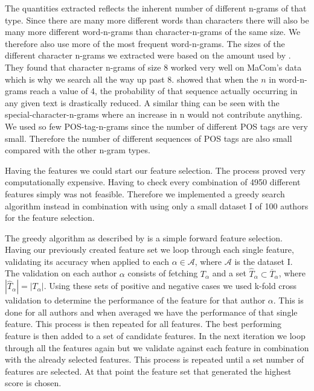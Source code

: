 The quantities extracted reflects the inherent number of different n-grams of
that type. Since there are many more different words than characters there will
also be many more different word-n-grams than character-n-grams of the same
size. We therefore also use more of the most frequent word-n-grams. The sizes
of the different character n-grams we extracted were based on the amount used by
\citet{aalykke2016}. They found that character n-grams of size 8 worked very
well on MaCom's data which is why we search all the way up past 8. \citet{US}
showed that when the $n$ in word-n-grams reach a value of 4, the probability of
that sequence actually occurring in any given text is drastically reduced. A
similar thing can be seen with the special-character-n-grams where an increase
in n would not contribute anything. We used so few \gls{POS}-tag-n-grams since
the number of different \gls{POS} tags are very small. Therefore the number of
different sequences of \gls{POS} tags are also small compared with the other
n-gram types.

Having the features we could start our feature selection. The process proved
very computationally expensive. Having to check every combination of 4950
different features simply was not feasible. Therefore we implemented a greedy
search algorithm instead in combination with using only a small dataset \gls{I}
of 100 authors for the feature selection.

The greedy algorithm as described by \citet{kanDeng} is a simple forward feature
selection. Having our previously created feature set we loop through each single
feature, validating its accuracy when applied to each $\alpha \in \mathcal{A}$,
where $\mathcal{A}$ is the dataset \gls{I}. The validation on each author
$\alpha$ consists of fetching $T_{\alpha}$ and a set $\hat{T}_{\alpha} \subset
\overline{T}_\alpha$, where $|\hat{T}_\alpha| = |T_\alpha|$. Using these sets
of positive and negative cases we used k-fold cross validation to determine
the performance of the feature for that author $\alpha$. This is done for all
authors and when averaged we have the performance of that single feature. This
process is then repeated for all features. The best performing feature is then
added to a set of candidate features. In the next iteration we loop through all
the features again but we validate against each feature in combination with
the already selected features. This process is repeated until a set number of
features are selected. At that point the feature set that generated the highest
score is chosen.

